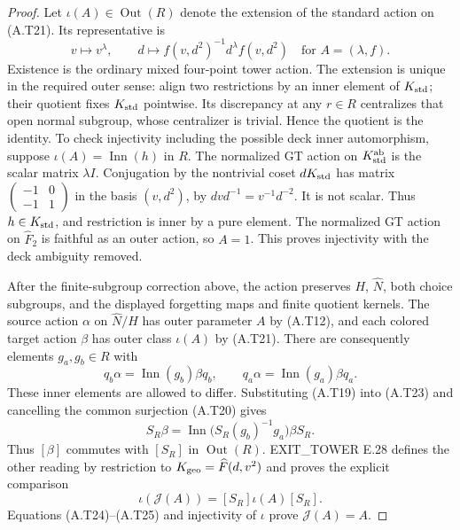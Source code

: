 \begin{proof}
Let $\iota(A)\in\operatorname{Out}(R)$ denote the extension
of the standard action on (A.T21).  Its representative is
\[
 v\longmapsto v^\lambda,\qquad
 d\longmapsto f(v,d^2)^{-1}d^\lambda f(v,d^2)
 \quad\text{for }A=(\lambda,f).                          \tag{A.T22}
\]
Existence is the ordinary mixed four-point tower action.
The extension is unique in the required outer sense:
align two restrictions by an inner element of $K_{\rm std}$;
their quotient fixes $K_{\rm std}$ pointwise.  Its
discrepancy at any $r\in R$ centralizes that open normal
subgroup, whose centralizer is trivial.  Hence the
quotient is the identity.  To check injectivity including
the possible deck inner automorphism, suppose
$\iota(A)=\operatorname{Inn}(h)$ in $R$.
The normalized GT action on $K_{\rm std}^{\rm ab}$ is
the scalar matrix $\lambda I$.  Conjugation by the
nontrivial coset $dK_{\rm std}$ has matrix
$\left(\begin{smallmatrix}-1&0\\-1&1\end{smallmatrix}\right)$
in the basis $(v,d^2)$, by $dvd^{-1}=v^{-1}d^{-2}$.
It is not scalar.  Thus $h\in K_{\rm std}$, and
restriction is inner by a pure element.  The normalized
GT action on $\widehat F_2$ is faithful as an outer
action, so $A=1$.  This proves injectivity with the
deck ambiguity removed.

After the finite-subgroup correction above, the action
preserves $H$, $\widehat N$, both choice subgroups, and
the displayed forgetting maps and finite quotient kernels.
The source action $\alpha$ on $\widehat N/H$ has outer
parameter $A$ by (A.T12), and each colored target action
$\beta$ has outer class $\iota(A)$ by (A.T21).
There are consequently elements $g_a,g_b\in R$ with
\[
 q_b\alpha=\operatorname{Inn}(g_b)\beta q_b,
 \qquad q_a\alpha=\operatorname{Inn}(g_a)\beta q_a.
                                                               \tag{A.T23}
\]
These inner elements are allowed to differ.  Substituting
(A.T19) into (A.T23) and cancelling the common
surjection (A.T20) gives
\[
 S_R\beta
  =\operatorname{Inn}\bigl(S_R(g_b)^{-1}g_a\bigr)\beta S_R.
                                                               \tag{A.T24}
\]
Thus $[\beta]$ commutes with $[S_R]$ in
$\operatorname{Out}(R)$.  EXIT\_TOWER E.28 defines the
other reading by restriction to
$K_{\rm geo}=\widehat F(d,v^2)$ and proves the explicit
comparison
\[
 \iota(\mathcal J(A))=[S_R]\iota(A)[S_R].                 \tag{A.T25}
\]
Equations (A.T24)--(A.T25) and injectivity of $\iota$
prove $\mathcal J(A)=A$.


\end{proof}
